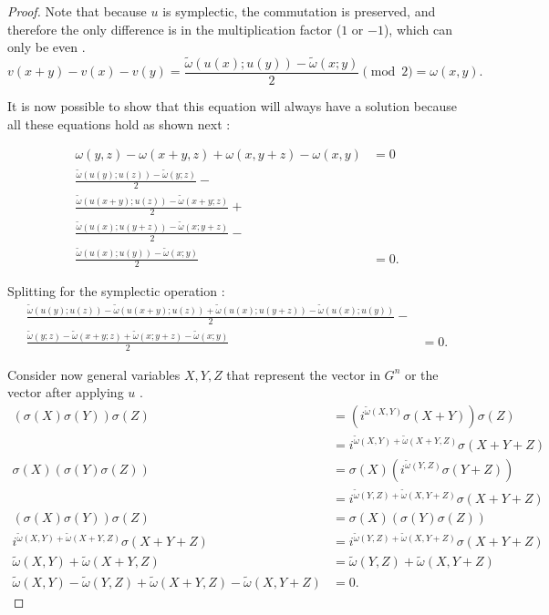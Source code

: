 \begin{theorem}
\begin{proof}
    Note that because $u$ is symplectic, the commutation is preserved, and therefore the only difference is in the multiplication factor ($1$ or $-1$), which can only be even \citep{Cesar2024}.
  \begin{equation}
    v(x + y) - v(x) - v(y) = \frac{\tilde{\omega}(u(x); u(y)) - \tilde{\omega}(x; y)}{2} \pmod 2 = \omega(x, y)
    \label{eq:symplectic2}
  .\end{equation}

    It is now possible to show that this equation will always have a solution because all these equations hold as shown next \citep{Cesar2024}:

  \begin{align*}
    \omega(y, z) - \omega(x + y, z) + \omega(x, y + z) - \omega(x, y) &= 0\\
    \frac{\tilde{\omega}(u(y); u(z)) - \tilde{\omega}(y; z)}{2} -& \\
    \frac{\tilde{\omega}(u(x + y); u(z)) - \tilde{\omega}(x + y; z)}{2} +& \\
    \frac{\tilde{\omega}(u(x); u(y + z)) - \tilde{\omega}(x; y + z)}{2} -& \\
    \frac{\tilde{\omega}(u(x); u(y)) - \tilde{\omega}(x; y)}{2} &= 0
  .\end{align*}

    Splitting for the symplectic operation \citep{Cesar2024}:
  \begin{align*}
    \frac{\tilde{\omega}(u(y); u(z)) - \tilde{\omega}(u(x + y); u(z)) + \tilde{\omega}(u(x); u(y + z)) - \tilde{\omega}(u(x); u(y))}{2} -& \\
    \frac{\tilde{\omega}(y; z) - \tilde{\omega}(x + y; z) + \tilde{\omega}(x; y + z) - \tilde{\omega}(x; y)}{2} &= 0
  .\end{align*}

    Consider now general variables $X, Y, Z$ that represent the vector in $G^n$ or the vector after applying $u$ \citep{Cesar2024}.
  \begin{align*}
    (\sigma(X)\sigma(Y))\sigma(Z) &= \left(i^{\tilde{\omega}(X, Y)}\sigma(X + Y)\right)\sigma(Z)\\
    &= i^{\tilde{\omega}(X, Y) + \tilde{\omega}(X + Y, Z)} \sigma(X + Y + Z)\\
    \sigma(X)(\sigma(Y)\sigma(Z)) &= \sigma(X)\left(i^{\tilde{\omega}(Y, Z)}\sigma(Y + Z)\right)\\
    &= i^{\tilde{\omega}(Y, Z) + \tilde{\omega}(X, Y + Z)}\sigma(X + Y + Z)\\
    (\sigma(X)\sigma(Y))\sigma(Z) &= \sigma(X)(\sigma(Y)\sigma(Z))\\
    i^{\tilde{\omega}(X, Y) + \tilde{\omega}(X + Y, Z)} \sigma(X + Y + Z) &= i^{\tilde{\omega}(Y, Z) + \tilde{\omega}(X, Y + Z)}\sigma(X + Y + Z)\\
    \tilde{\omega}(X, Y) + \tilde{\omega}(X + Y, Z) &= \tilde{\omega}(Y, Z) + \tilde{\omega}(X, Y + Z)\\
    \tilde{\omega}(X, Y) - \tilde{\omega}(Y, Z) + \tilde{\omega}(X + Y, Z) -  \tilde{\omega}(X, Y + Z) &=  0
  .\end{align*}


\end{proof}
\end{theorem}
